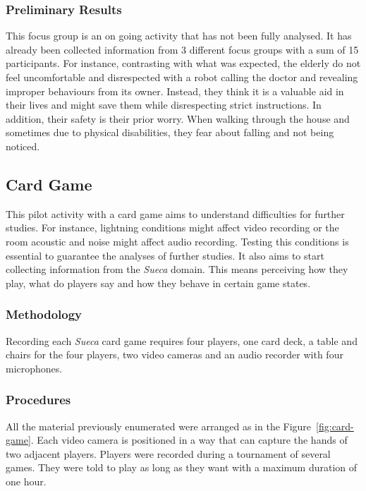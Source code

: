 \subsubsection{Preliminary Results}

This focus group is an on going activity that has not been fully analysed.
It has already been collected information from 3 different focus groups with a sum of 15 participants.
For instance, contrasting with what was expected, the elderly do not feel uncomfortable and disrespected with a robot calling the doctor and revealing improper behaviours from its owner.
Instead, they think it is a valuable aid in their lives and might save them while disrespecting strict instructions.
In addition, their safety is their prior worry.
When walking through the house and sometimes due to physical disabilities, they fear about falling and not being noticed.







\subsection{Card Game}
This pilot activity with a card game aims to understand difficulties for further studies.
For instance, lightning conditions might affect video recording or the room acoustic and noise might affect audio recording.
Testing this conditions is essential to guarantee the analyses of further studies.
It also aims to start collecting information from the \emph{Sueca} domain.
This means perceiving how they play, what do players say and how they behave in certain game states.

\subsubsection{Methodology}
Recording each \emph{Sueca} card game requires four players, one card deck, a table and chairs for the four players, two video cameras and an audio recorder with four microphones.

\subsubsection{Procedures}
All the material previously enumerated were arranged as in the Figure~\ref{fig:card-game}.
Each video camera is positioned in a way that can capture the hands of two adjacent players.
Players were recorded during a tournament of several games.
They were told to play as long as they want with a maximum duration of one hour.

